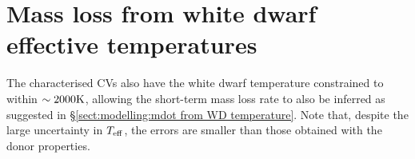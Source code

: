 \begin{table}
\begin{tabular}{llccc}
        \hline
    \end{tabular}
\end{table}


\section{Mass loss from white dwarf effective temperatures}
\label{sect:modelling:white dwarf mass loss rates}

The characterised CVs also have the white dwarf temperature constrained to within $\sim 2000 \rm K$, allowing the short-term mass loss rate to also be inferred as suggested in \S\ref{sect:modelling:mdot from WD temperature}.
Note that, despite the large uncertainty in $T_{\rm eff}$, the errors are smaller than those obtained with the donor properties.

